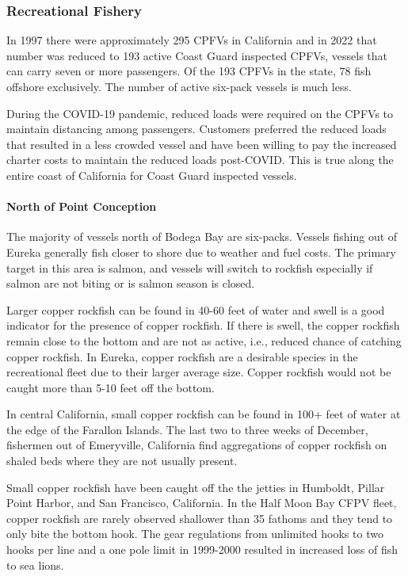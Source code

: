 \documentclass[11pt,
  english,
  letterpaper,
]{article}
\begin{document}
\hypertarget{recreational-fishery-1}{%
\subsubsection{Recreational Fishery}\label{recreational-fishery-1}}

In 1997 there were approximately 295 CPFVs in California and in 2022 that number was reduced to 193 active Coast Guard inspected CPFVs, vessels that can carry seven or more passengers. Of the 193 CPFVs in the state, 78 fish offshore exclusively. The number of active six-pack vessels is much less.

During the COVID-19 pandemic, reduced loads were required on the CPFVs to maintain distancing among passengers. Customers preferred the reduced loads that resulted in a less crowded vessel and have been willing to pay the increased charter costs to maintain the reduced loads post-COVID. This is true along the entire coast of California for Coast Guard inspected vessels.

\hypertarget{north-of-point-conception}{%
\paragraph{North of Point Conception}\label{north-of-point-conception}}

The majority of vessels north of Bodega Bay are six-packs. Vessels fishing out of Eureka generally fish closer to shore due to weather and fuel costs. The primary target in this area is salmon, and vessels will switch to rockfish especially if salmon are not biting or is salmon season is closed.

Larger copper rockfish can be found in 40-60 feet of water and swell is a good indicator for the presence of copper rockfish. If there is swell, the copper rockfish remain close to the bottom and are not as active, i.e., reduced chance of catching copper rockfish. In Eureka, copper rockfish are a desirable species in the recreational fleet due to their larger average size. Copper rockfish would not be caught more than 5-10 feet off the bottom.

In central California, small copper rockfish can be found in 100+ feet of water at the edge of the Farallon Islands. The last two to three weeks of December, fishermen out of Emeryville, California find aggregations of copper rockfish on shaled beds where they are not usually present.

Small copper rockfish have been caught off the the jetties in Humboldt, Pillar Point Harbor, and San Francisco, California. In the Half Moon Bay CFPV fleet, copper rockfish are rarely observed shallower than 35 fathoms and they tend to only bite the bottom hook. The gear regulations from unlimited hooks to two hooks per line and a one pole limit in 1999-2000 resulted in increased loss of fish to sea lions.
\end{document}
